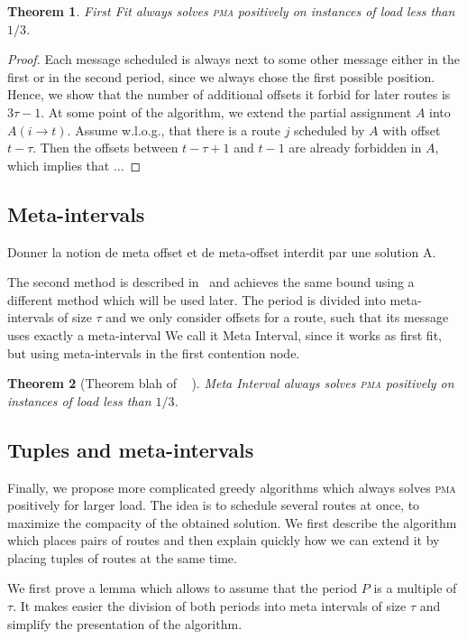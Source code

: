 \documentclass[10pt, conference, letterpaper]{IEEEtran}
\newtheorem{theorem}{Theorem}
\newcommand\pma{\textsc{pma}\xspace}
\begin{document}
\begin{theorem}
First Fit always solves \pma positively on instances of load less than
$1/3$. 
\end{theorem}
\begin{proof}
Each message scheduled is always next to some other message either in the first or in the second period, since we always chose the first possible position. Hence, we show that the number of additional offsets it forbid for later routes is $3\tau -1$. At some point of the algorithm, we extend the partial assignment $A$ into $A(i \rightarrow t)$. Assume w.l.o.g., that there is a route $j$ scheduled by $A$ with offset $t-\tau$. Then the offsets between
$t-\tau + 1$ and $t-1$ are already forbidden in $A$, which implies that ...
\end{proof}

\subsection{Meta-intervals}

Donner la notion de meta offset et de meta-offset interdit par une solution A.

The second method is described  in~\cite{barth2018deterministic} and achieves the same bound using a different method which will be used later.
The period is divided into meta-intervals of size $\tau$ and we only consider offsets
for a route, such that its message uses exactly a meta-interval
We call it Meta Interval, since it works as first fit, but using meta-intervals
in the first contention node.
\begin{theorem}[Theorem blah of ~\cite{barth2018deterministic} ]
Meta Interval always solves \pma positively on instances of load less than
$1/3$.
\end{theorem}

\subsection{Tuples and meta-intervals}

Finally, we propose more complicated greedy algorithms which 
always solves \pma positively for larger load. The idea is to schedule several routes at once, to maximize the compacity of the obtained solution. We first describe the algorithm 
which places pairs of routes and then explain quickly how we can extend it by placing tuples
of routes at the same time.

We first prove a lemma which allows to assume that the period $P$ is a multiple of $\tau$.
It makes easier the division of both periods into meta intervals of size $\tau$ and 
simplify the presentation of the algorithm.
\end{document}
